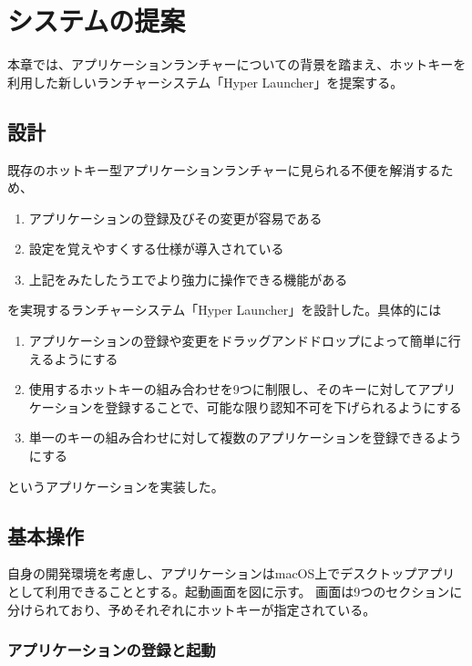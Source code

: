 \chapter{システムの提案}
\label{chap:system}

本章では、アプリケーションランチャーについての背景を踏まえ、ホットキーを利用した新しいランチャーシステム「Hyper Launcher」を提案する。

\section{設計}

既存のホットキー型アプリケーションランチャーに見られる不便を解消するため、

\begin{enumerate}
	\item アプリケーションの登録及びその変更が容易である
	\item 設定を覚えやすくする仕様が導入されている
	\item 上記をみたしたうエでより強力に操作できる機能がある
\end{enumerate}

を実現するランチャーシステム「Hyper Launcher」を設計した。具体的には

\begin{enumerate}
	\item アプリケーションの登録や変更をドラッグアンドドロップによって簡単に行えるようにする
	\item 使用するホットキーの組み合わせを9つに制限し、そのキーに対してアプリケーションを登録することで、可能な限り認知不可を下げられるようにする
	\item 単一のキーの組み合わせに対して複数のアプリケーションを登録できるようにする
\end{enumerate}

というアプリケーションを実装した。

\section{基本操作}

自身の開発環境を考慮し、アプリケーションはmacOS上でデスクトップアプリとして利用できることとする。起動画面を図に示す。
画面は9つのセクションに分けられており、予めそれぞれにホットキーが指定されている。

\subsection{アプリケーションの登録と起動}

